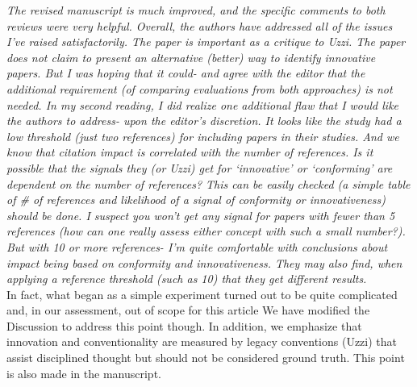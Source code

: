 \documentclass[11pt, oneside]{article}   	%
\begin{document}
\emph{The revised manuscript is much improved, and the specific comments to both reviews were very helpful. Overall, the authors have addressed all of the issues I’ve raised satisfactorily. The paper is important as a critique to Uzzi. The paper does not claim to present an alternative (better) way to identify innovative papers.  But I was hoping that it could- and agree with the editor that the additional requirement (of comparing evaluations from both approaches) is not needed. In my second reading, I did realize one additional flaw that I would like the authors to address- upon the editor’s discretion.  It looks like the study had a low threshold (just two references) for including papers in their studies. And we know that citation impact is correlated with the number of references. Is it possible that the signals they (or Uzzi) get for ‘innovative’ or ‘conforming’ are dependent on the number of references? This can be easily checked (a simple table of \# of references and likelihood of a signal of conformity or innovativeness) should be done. I suspect you won’t get any signal for papers with fewer than 5 references (how can one really assess either concept with such a small number?).  But with 10 or more references- I'm quite comfortable with conclusions about impact being based on conformity and innovativeness. They may also find, when applying a reference threshold (such as 10) that they get different results.}\\
\vspace{3mm}
In fact, what began as a simple experiment turned out to be quite complicated and, in our assessment, out of scope for this article  We have modified the Discussion to address this point though. In addition, we emphasize that innovation and conventionality are measured by legacy conventions (Uzzi) that assist disciplined thought but should not be considered ground truth. This point is also made in the manuscript.
\end{document}
